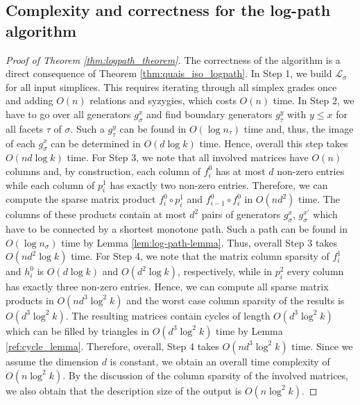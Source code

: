 \subsection{Complexity and correctness for the log-path algorithm} \label{app:log_path_algo}
%
\logpathalgo*
%
\begin{proof}[Proof of Theorem \ref{thm:logpath_theorem}]
The correctness of the algorithm is a direct consequence of Theorem \ref{thm:quais_iso_logpath}. In Step 1, we build $\mathcal{L}_\sigma$ for all input simplices. This requires iterating through all simplex grades once and adding $O(n)$ relations and syzygies, which costs $O(n)$ time. In Step 2, we have to go over all generators $g_\sigma^x$ and find boundary generators $g_\tau^y$ with $y\leq x$ for all facets $\tau$ of $\sigma$. Such a $g_\tau^y$ can be found in $O(\log n_\tau)$ time and, thus, the image of each $g_\sigma^x$ can be determined in $O(d\log k)$ time. Hence, overall this step takes $O(nd\log k)$ time. For Step 3, we note that all involved matrices have $O(n)$ columns and, by construction, each column of $f^0_i$ has at most $d$ non-zero entries while each column of $p^1_i$ has exactly two non-zero entries. Therefore, we can compute the sparse matrix product $f^0_i\circ p^1_i$ and $f^0_{i-1}\circ f^0_i$ in $O(nd^2)$ time. The columns of these products contain at most $d^2$ pairs of generators $g^x_\sigma$, $g_\sigma^{x'}$ which have to be connected by a shortest monotone path. Such a path can be found in $O(\log n_\sigma)$ time by Lemma \ref{lem:log-path-lemma}. Thus, overall Step 3 takes $O(nd^2\log k)$ time. For Step 4, we note that the matrix column sparsity of $f^1_i$ and $h^0_i$ is $O(d\log k)$ and $O(d^2\log k)$, respectively, while in $p^2_i$ every column has exactly three non-zero entries. Hence, we can compute all sparse matrix products in $O(nd^3\log^2 k)$ and the worst case column sparsity of the results is $O(d^3\log^2k)$. The resulting matrices contain cycles of length $O(d^3\log^2k)$ which can be filled by triangles in $O(d^3\log^2k)$ time by Lemma \ref{ref:cycle_lemma}. Therefore, overall, Step 4 takes $O(nd^3\log^2k)$ time. Since we assume the dimension $d$ is constant, we obtain an overall time complexity of $O(n\log^2 k)$. By the discussion of the column sparsity of the involved matrices, we also obtain that the description size of the output is $O(n\log^2 k)$.
\end{proof}
%
